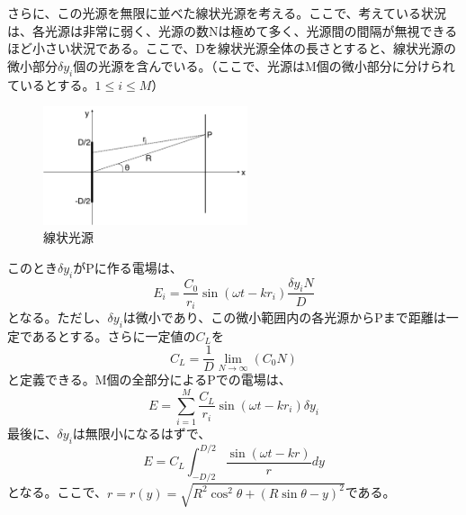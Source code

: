 \documentclass[10pt]{ujarticle}
\begin{document}
さらに、この光源を無限に並べた線状光源を考える。ここで、考えている状況は、各光源は非常に弱く、光源の数Nは極めて多く、光源間の間隔が無視できるほど小さい状況である。ここで、Dを線状光源全体の長さとすると、線状光源の微小部分$\delta y_i$個の光源を含んでいる。（ここで、光源はM個の微小部分に分けられているとする。$1 \leq i \leq M$）
\\
\begin{figure}[b]
\begin{center}
\includegraphics[width=6cm, bb = 0 0 600 200]{SummerChallenge_lineray.png}
\caption{線状光源}
\end{center}
\end{figure}

\clearpage
このとき$\delta y_i$がPに作る電場は、
\[
E_i = \frac{C_0}{r_i} \sin(\omega t- k r_i ) \frac{\delta y_i N}{D}
\]
となる。ただし、$\delta y_i$は微小であり、この微小範囲内の各光源からPまで距離は一定であるとする。さらに一定値の$C_L$を
\[
C_L = \frac{1}{D}  \lim_{N \to \infty} (C_0 N)
\]
と定義できる。M個の全部分によるPでの電場は、
\[
E = \sum_{i=1}^M \frac{C_L}{r_i} \sin(\omega t - k r_i) \delta y_i
\]
最後に、$\delta y_i$は無限小になるはずで、
\[
E = C_L \int_{-D/2}^{D/2} \frac{\sin(\omega t - k r)}{r} dy
\]
となる。ここで、$r = r(y)=\sqrt{R^2 \cos^2 \theta + (R\sin \theta - y )^2}$である。
\end{document}
